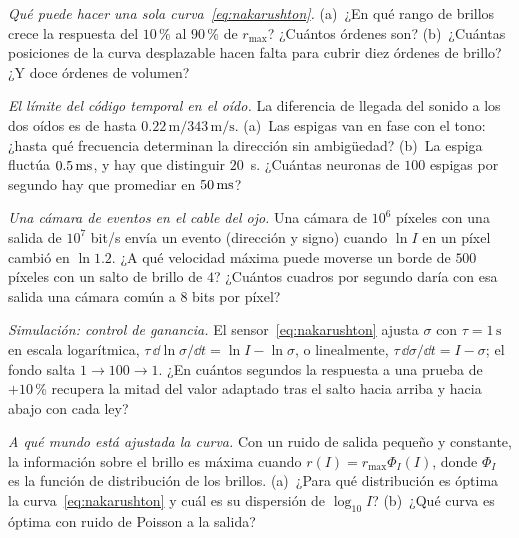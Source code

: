 \begin{exercise}[\lvlB]
\label{ex:11:3}
\emph{Qué puede hacer una sola curva~\eqref{eq:nakarushton}.} (a)~¿En qué rango de brillos crece la respuesta del $10\,\%$ al $90\,\%$ de $r_{\max}$? ¿Cuántos órdenes son? (b)~¿Cuántas posiciones de la curva desplazable hacen falta para cubrir diez órdenes de brillo? ¿Y doce órdenes de volumen?
\end{exercise}

\begin{exercise}[\lvlB]
\label{ex:11:4}
\emph{El límite del código temporal en el oído.} La diferencia de llegada del sonido a los dos oídos es de hasta $0.22\,\text{m}/343\,\text{m/s}$. (a)~Las espigas van en fase con el tono: ¿hasta qué frecuencia determinan la dirección sin ambigüedad? (b)~La espiga fluctúa $0.5\,\text{ms}$, y hay que distinguir $20$~\textmu s. ¿Cuántas neuronas de $100$ espigas por segundo hay que promediar en $50\,\text{ms}$?
\end{exercise}

\begin{exercise}[\lvlB]
\label{ex:11:5}
\emph{Una cámara de eventos en el cable del ojo.} Una cámara de $10^6$ píxeles con una salida de $10^7$ bit/s envía un evento (dirección y signo) cuando $\ln I$ en un píxel cambió en $\ln1.2$. ¿A qué velocidad máxima puede moverse un borde de $500$ píxeles con un salto de brillo de $4$? ¿Cuántos cuadros por segundo daría con esa salida una cámara común a $8$ bits por píxel?
\end{exercise}

\begin{exercise}[\lvlB]
\label{ex:11:6}
\emph{Simulación: control de ganancia.} El sensor~\eqref{eq:nakarushton} ajusta $\sigma$ con $\tau=1\,\text{s}$ en escala logarítmica, $\tau\,\dd\ln\sigma/\dd t=\ln I-\ln\sigma$, o linealmente, $\tau\,\dd\sigma/\dd t=I-\sigma$; el fondo salta $1\to100\to1$. ¿En cuántos segundos la respuesta a una prueba de $+10\,\%$ recupera la mitad del valor adaptado tras el salto hacia arriba y hacia abajo con cada ley?
\end{exercise}

\begin{exercise}[\lvlC]
\label{ex:11:7}
\emph{A qué mundo está ajustada la curva.} Con un ruido de salida pequeño y constante, la información sobre el brillo es máxima cuando $r(I)=r_{\max}\Phi_I(I)$, donde $\Phi_I$ es la función de distribución de los brillos. (a)~¿Para qué distribución es óptima la curva~\eqref{eq:nakarushton} y cuál es su dispersión de $\log_{10}I$? (b)~¿Qué curva es óptima con ruido de Poisson a la salida?
\end{exercise}
